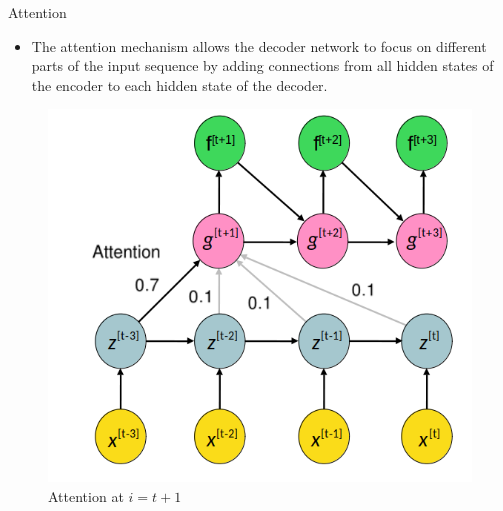 \begin{vbframe}{Attention}
   \framebreak
   
   \begin{itemize}  
    \item The attention mechanism allows the decoder network to focus on different parts of the input sequence by adding connections from all hidden states of the encoder to each hidden state of the decoder.
  \end{itemize}
 \begin{figure}
    \includegraphics[width=5.cm]{figure/seq2seq_3.png}
    \caption{Attention at $i=t+1$}
  \end{figure}
 

\end{vbframe}
